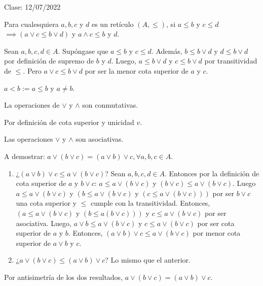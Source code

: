 Clase: 12/07/2022

\begin{teorema}
    Para cualesquiera $a,b,c$ y $d$ es un retículo $(A,\leq)$, si $a\leq b$ y $c\leq d$ $\implies (a\vee c \leq b\vee d)$ y $a\wedge c\leq b$ y $d$.
    \begin{dem}
        Sean $a,b,c,d\in A$. Supóngase que $a\leq b$ y $c\leq d$. Además, $b\leq b\vee d$ y $d\leq b\vee d$ por definición de supremo de $b$ y $d$. Luego, $a\leq b\vee d$ y $c\leq b\vee d$ por transitividad de $\leq$. Pero $a\vee c\leq b\vee d$ por ser la menor cota superior de $a$ y $c$. 
    \end{dem} 
\end{teorema}

\begin{nota}
    $a<b:=a\leq b$ y $a\neq b$. 
\end{nota}

\begin{teorema}
    La operaciones de $\vee$ y $\wedge$ son conmutativas. 
    \begin{dem}
        Por definición de cota superior y unicidad $v$. 
    \end{dem}
\end{teorema}


\begin{teorema}
    Las operaciones $\vee$ y $\wedge$ son asociativas. 
    \begin{dem}
        A demostrar: $a\vee (b\vee c) = (a\vee b)\vee c, \forall a,b,c\in A$.
        \begin{enumerate}
            \item ¿$(a\vee b)\vee c\leq a\vee (b\vee c)$? Sean $a,b,c,d\in A$. Entonces por la definición de cota superior de $a$ y $b\vee c$:  $a\leq a\vee (b\vee c)$ y $(b\vee c)\leq a\vee (b\vee c)$. Luego $a\leq a\vee (b\vee c)$ y $(b\leq a\vee(b\vee c) \text{ y } (c\leq a\vee (b\vee c)))$ por ser $b\vee c$ una cota superior y $\leq $ cumple con la transitividad. Entonces, $(a\leq a\vee (b\vee c) \text { y } (b\leq a (b\vee c)))$ y $c\leq a\vee (b\vee c)$  por ser asociativa. Luego, $a\vee b\leq a\vee(b\vee c)$ y $c\leq a\vee (b\vee c)$ por ser cota superior de $a$ y $b$. Entonces, $(a\vee b)\vee c\leq a\vee (b\vee c)$ por menor cota superior de $a\vee b$ y $c$. 
            \item ¿$a\vee (b\vee c) \leq (a\vee b)\vee c$? Lo mismo que el anterior. 
        \end{enumerate}
        Por antisimetría de los dos resultados, 
        $a\vee (b\vee c) = (a\vee b)\vee c$.
    \end{dem}
\end{teorema}

